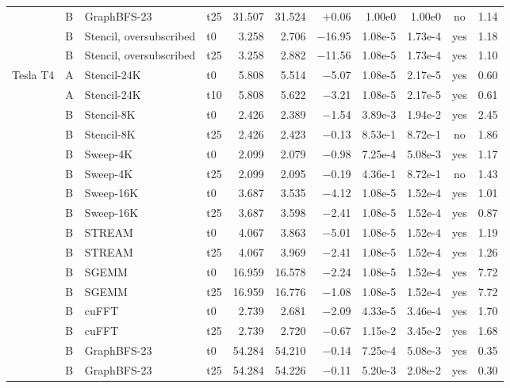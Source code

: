 \begin{tabular}{@{}llllrrrrrcr@{}}
 & B & GraphBFS-23 & t25 & 31.507 & 31.524 & +0.06 & 1.00e0 & 1.00e0 & no & 1.14 \\ %
 & B & Stencil, oversubscribed & t0 & 3.258 & 2.706 & $-$16.95 & 1.08e-5 & 1.73e-4 & yes & 1.18 \\ %
 & B & Stencil, oversubscribed & t25 & 3.258 & 2.882 & $-$11.56 & 1.08e-5 & 1.73e-4 & yes & 1.10 \\ %
\midrule
Tesla T4 & A & Stencil-24K & t0 & 5.808 & 5.514 & $-$5.07 & 1.08e-5 & 2.17e-5 & yes & 0.60 \\ %
 & A & Stencil-24K & t10 & 5.808 & 5.622 & $-$3.21 & 1.08e-5 & 2.17e-5 & yes & 0.61 \\ %
 & B & Stencil-8K & t0 & 2.426 & 2.389 & $-$1.54 & 3.89e-3 & 1.94e-2 & yes & 2.45 \\ %
 & B & Stencil-8K & t25 & 2.426 & 2.423 & $-$0.13 & 8.53e-1 & 8.72e-1 & no & 1.86 \\ %
 & B & Sweep-4K & t0 & 2.099 & 2.079 & $-$0.98 & 7.25e-4 & 5.08e-3 & yes & 1.17 \\ %
 & B & Sweep-4K & t25 & 2.099 & 2.095 & $-$0.19 & 4.36e-1 & 8.72e-1 & no & 1.43 \\ %
 & B & Sweep-16K & t0 & 3.687 & 3.535 & $-$4.12 & 1.08e-5 & 1.52e-4 & yes & 1.01 \\ %
 & B & Sweep-16K & t25 & 3.687 & 3.598 & $-$2.41 & 1.08e-5 & 1.52e-4 & yes & 0.87 \\ %
 & B & STREAM & t0 & 4.067 & 3.863 & $-$5.01 & 1.08e-5 & 1.52e-4 & yes & 1.19 \\ %
 & B & STREAM & t25 & 4.067 & 3.969 & $-$2.41 & 1.08e-5 & 1.52e-4 & yes & 1.26 \\ %
 & B & SGEMM & t0 & 16.959 & 16.578 & $-$2.24 & 1.08e-5 & 1.52e-4 & yes & 7.72 \\ %
 & B & SGEMM & t25 & 16.959 & 16.776 & $-$1.08 & 1.08e-5 & 1.52e-4 & yes & 7.72 \\ %
 & B & cuFFT & t0 & 2.739 & 2.681 & $-$2.09 & 4.33e-5 & 3.46e-4 & yes & 1.70 \\ %
 & B & cuFFT & t25 & 2.739 & 2.720 & $-$0.67 & 1.15e-2 & 3.45e-2 & yes & 1.68 \\ %
 & B & GraphBFS-23 & t0 & 54.284 & 54.210 & $-$0.14 & 7.25e-4 & 5.08e-3 & yes & 0.35 \\ %
 & B & GraphBFS-23 & t25 & 54.284 & 54.226 & $-$0.11 & 5.20e-3 & 2.08e-2 & yes & 0.30 \\ %
\bottomrule
\end{tabular}
